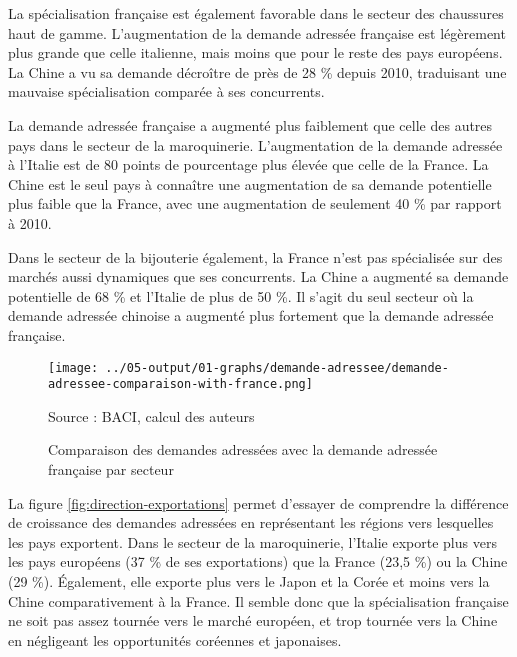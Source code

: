 \documentclass[french,10pt,a4paper]{article}
\begin{document}
La spécialisation française est également favorable dans le secteur des chaussures haut de gamme. L'augmentation de la demande adressée française est légèrement plus grande que celle italienne, mais moins que pour le reste des pays européens. La Chine a vu sa demande décroître de près de 28 \% depuis 2010, traduisant une mauvaise spécialisation comparée à ses concurrents.

La demande adressée française a augmenté plus faiblement que celle des autres pays dans le secteur de la maroquinerie. L'augmentation de la demande adressée à l'Italie est de 80 points de pourcentage plus élevée que celle de la France. La Chine est le seul pays à connaître une augmentation de sa demande potentielle plus faible que la France, avec une augmentation de seulement 40 \% par rapport à 2010.

Dans le secteur de la bijouterie également, la France n'est pas spécialisée sur des marchés aussi dynamiques que ses concurrents. La Chine a augmenté sa demande potentielle de 68 \% et l'Italie de plus de 50 \%. Il s'agit du seul secteur où la demande adressée chinoise a augmenté plus fortement que la demande adressée française. 


\begin{figure}[!h]
  \centering
  \texttt{[image: ../05-output/01-graphs/demande-adressee/demande-adressee-comparaison-with-france.png]}
  \captionsetup{justification=raggedright,singlelinecheck=false, font=small}
  \caption*{Source : BACI, calcul des auteurs}
  \captionsetup{justification=centering, singlelinecheck=true, font=normalsize}
  \caption{Comparaison des demandes adressées avec la demande adressée française par secteur}
  \label{fig:demande-adressee}
\end{figure}

\bigskip
La figure \ref{fig:direction-exportations} permet d'essayer de comprendre la différence de croissance des demandes adressées en représentant les régions vers lesquelles les pays exportent. Dans le secteur de la maroquinerie, l'Italie exporte plus vers les pays européens (37 \% de ses exportations) que la France (23,5 \%) ou la Chine (29 \%). Également, elle exporte plus vers le Japon et la Corée et moins vers la Chine comparativement à la France. Il semble donc que la spécialisation française ne soit pas assez tournée vers le marché européen, et trop tournée vers la Chine en négligeant les opportunités coréennes et japonaises.
\end{document}
